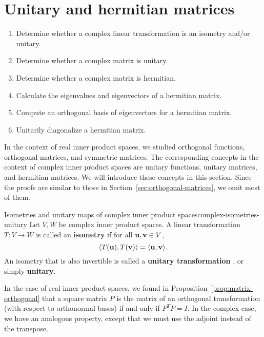 \section{Unitary and hermitian matrices}

\begin{outcome}
  \begin{enumerate}
  \item Determine whether a complex linear transformation is an
    isometry and/or unitary.
  \item Determine whether a complex matrix is unitary.
  \item Determine whether a complex matrix is hermitian.
  \item Calculate the eigenvalues and eigenvectors of a hermitian
    matrix.
  \item Compute an orthogonal basis of eigenvectors for a hermitian
    matrix.
  \item Unitarily diagonalize a hermitian matrix. 
  \end{enumerate}
\end{outcome}

In the context of real inner product spaces, we studied orthogonal
functions, orthogonal matrices, and symmetric matrices. The
corresponding concepts in the context of complex inner product spaces
are unitary functions, unitary matrices, and hermitian matrices. We
will introduce these concepts in this section. Since the proofs are
similar to those in Section~\ref{sec:orthogonal-matrices}, we omit
most of them.

\begin{definition}{Isometries and unitary maps of complex inner product spaces}{complex-isometries-unitary}
  Let $V,W$ be complex inner product spaces. A linear transformation
  $T:V\to W$ is called an \textbf{isometry}%
   if for all
  $\vect{u},\vect{v}\in V$,
  \begin{equation*}
    \iprod{T(\vect{u}),T(\vect{v})} = \iprod{\vect{u},\vect{v}}.
  \end{equation*}
  An isometry that is also invertible is called a \textbf{unitary
    transformation}%
  , or simply \textbf{unitary}.
\end{definition}

In the case of real inner product spaces, we found in
Proposition~\ref{prop:matrix-orthogonal} that a square matrix $P$ is
the matrix of an orthogonal transformation (with respect to
orthonormal bases) if and only if $P^TP=I$. In the complex case, we
have an analogous property, except that we must use the adjoint
instead of the transpose.

